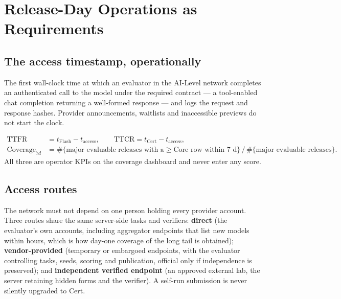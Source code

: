 \section{Release-Day Operations as Requirements}\label{sec:ops}

\subsection{The access timestamp, operationally}
\begin{definition}
The first wall-clock time at which an evaluator in the AI-Level network completes an authenticated call to the model under the required contract --- a tool-enabled chat completion returning a well-formed response --- and logs the request and response hashes. Provider announcements, waitlists and inaccessible previews do not start the clock.
\end{definition}
\begin{align*}
\mathrm{TTFR} &= t_{\mathrm{Flash}} - t_{\text{access}}, \qquad \mathrm{TTCR} = t_{\mathrm{Cert}} - t_{\text{access}},\\
\mathrm{Coverage}_{7d} &= \#\{\text{major evaluable releases with a} \ge \text{Core row within 7 d}\} \,/\, \#\{\text{major evaluable releases}\}.
\end{align*}
All three are operator KPIs on the coverage dashboard and never enter any score.

\subsection{Access routes}
The network must not depend on one person holding every provider account. Three routes share the same server-side tasks and verifiers: \textbf{direct} (the evaluator's own accounts, including aggregator endpoints that list new models within hours, which is how day-one coverage of the long tail is obtained); \textbf{vendor-provided} (temporary or embargoed endpoints, with the evaluator controlling tasks, seeds, scoring and publication, official only if independence is preserved); and \textbf{independent verified endpoint} (an approved external lab, the server retaining hidden forms and the verifier). A self-run submission is never silently upgraded to Cert.

